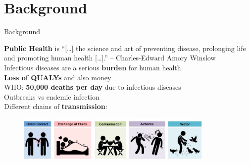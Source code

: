 \documentclass[table]{beamer}\usepackage[]{graphicx}\usepackage[]{color}
\begin{document}
\section{Background}
\begin{frame}[fragile]{Background}

\textbf{Public Health} is ``[\ldots] the science and art of preventing disease, prolonging life and promoting human health [\ldots].'' -- Charles-Edward Amory Winslow \\
\vspace{0.3cm}
Infectious diseases are a serious \textbf{burden} for human health \\
\vspace{0.3cm}
\textbf{Loss of QUALYs} and also money \\ %
\vspace{0.3cm}
WHO: \textbf{50,000 deaths per day} due to infectious diseases \\ %
\vspace{0.3cm}
Outbreaks vs endemic infection \\ %
\vspace{0.3cm}
Different chains of \textbf{transmission}:
\begin{figure}
  \flushleft
  \includegraphics[width=0.85\textwidth,keepaspectratio]{disease-transmission_med.jpeg}
\end{figure}

\end{frame}
\end{document}
